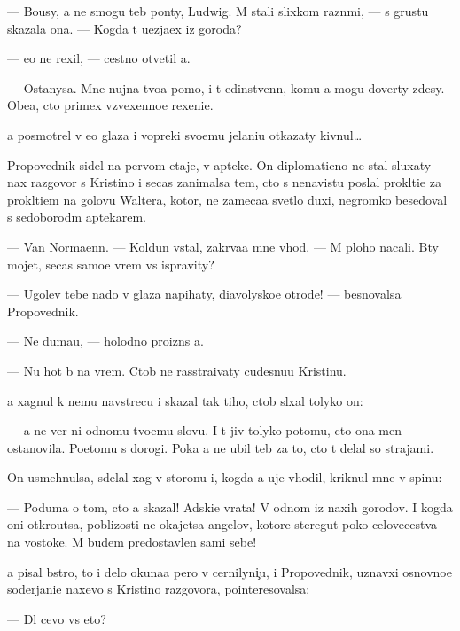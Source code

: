 \documentclass[10pt]{book}
\begin{document}
— Bo{\y}usy, {\y}a ne smogu teb{\ia} pon{\ia}ty, Ludwig. M{\yi} stali slixkom razn{\yi}mi, — s grust{\y}u skazala ona. — Kogda t{\yi} u{\y}ezja{\y}ex iz go\-ro\-da?

— {\Y}e{\x}o ne rexil, — cestno otvetil {\y}a.

— Ostanysa. Mne nujna tvo{\y}a pomo{\x}, i t{\yi} {\y}edinstvenn{\yi}{\y}, komu {\y}a mogu dove\-r{\ia}ty zdesy. Obe{\x}a{\y}, cto primex vzvexenno{\y}e rexeni{\y}e.

{\Y}a posmotrel v {\y}e{\y}o glaza i vopreki svo{\y}emu jelani{\y}u otkazaty kivnul…

Pro\-po\-ved\-nik sidel na pervom etaje, v apteke. On diplomaticno ne stal sluxaty nax razgovor s Kristino{\y} i se{\y}cas zanimalsa tem, cto s nenavist{\y}u pos{\yi}lal prokl{\ia}ti{\y}e za prokl{\ia}ti{\y}em na golovu Waltera, kotor{\yi}{\y}, ne zameca{\y}a svetlo{\y} duxi, negromko besedoval s sedoborod{\yi}m aptekarem.

— Van Normaenn. — Koldun vstal, zakr{\yi}va{\y}a mne v{\yi}hod. — M{\yi} ploho nacali. B{\yi}ty mojet, se{\y}cas samo{\y}e vrem{\ia} vs{\e} ispravity?

— Ugol{\y}ev tebe nado v glaza napihaty, diavolysko{\y}e otrod{\y}e! — besnovalsa Pro\-po\-ved\-nik.

— Ne duma{\y}u, — holodno proizn{\e}s {\y}a.

— Nu hot{\ia} b{\yi} na vrem{\ia}. Ctob{\yi} ne rasstra{\y}ivaty cudesnu{\y}u Kristinu.

{\Y}a xagnul k nemu navstrecu i skazal tak tiho, ctob{\yi} sl{\yi}xal tolyko on:

— {\Y}a ne ver{\io} ni odnomu tvo{\y}emu slovu. I t{\yi} jiv tolyko potomu, cto ona men{\ia} ostanovila. Poetomu s dorogi. Poka {\y}a ne ubil teb{\ia} za to, cto t{\yi} delal so strajami.

On usmehnulsa, sdelal xag v storonu i, kogda {\y}a uje v{\yi}hodil, kriknul mne v spinu:

— Poduma{\y} o tom, cto {\y}a skazal! Adski{\y}e vra\-ta! V odnom iz naxih gorodov. I kogda oni otkro{\y}utsa, poblizosti ne okajetsa angelov, ko\-to\-r{\yi}\-{\y}e steregut poko{\y} celovecestva na vostoke. M{\yi} budem predostavlen{\yi} sami sebe!



{\Y}a pisal b{\yi}stro, to i delo okuna{\y}a pero v cernilyni{\c}u, i Pro\-po\-ved\-nik, uznavxi{\y} osnovno{\y}e soderjani{\y}e naxevo s Kristino{\y} razgovora, pointeresovalsa:

— Dl{\ia} cevo vs{\e} eto?
\end{document}

